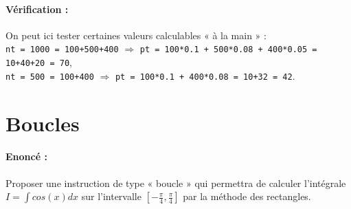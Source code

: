 \documentclass[11pt,a4paper]{article}
\begin{document}
\paragraph{Vérification :}
On peut ici tester certaines valeurs calculables « à la main » :\\
\texttt{nt = 1000 = 100+500+400} $\Rightarrow$ \texttt{pt = 100*0.1 + 500*0.08 + 400*0.05 = 10+40+20 = 70},\\
\texttt{nt = 500 = 100+400} $\Rightarrow$ \texttt{pt = 100*0.1 + 400*0.08 = 10+32 = 42}.

\section{Boucles}

\paragraph{Enoncé :}
Proposer une instruction de type « boucle » qui permettra de calculer l'intégrale $I = \int cos(x) dx$ 
sur l'intervalle $[-\frac{\pi}{4},\frac{\pi}{4}]$ par la méthode des rectangles.
\end{document}
